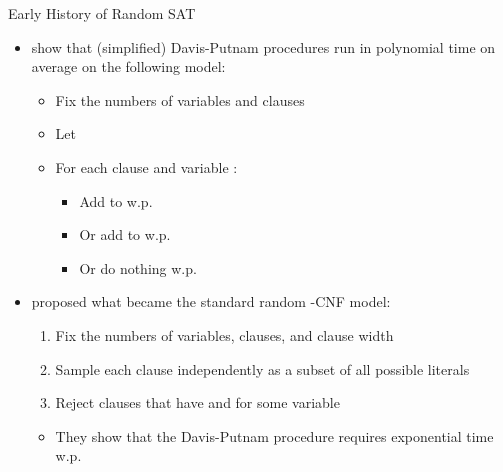 \documentclass{beamer}
\begin{document}
\begin{frame}{Early History of Random SAT}
  \begin{itemize}
    \item \textcolor{gray}{\textcite{DBLP:journals/ipl/GoldbergPB82}} show that
          (simplified) \alert{Davis-Putnam procedures} run in \alert{polynomial
          time} on average on the following model:
          \begin{itemize}
            \item Fix the numbers of \alert{variables} and \alert{clauses}
            \item Let 
            \item For each clause  and variable :
            \begin{itemize}
              \item \alert{Add}  to  w.p.\
              \item Or \alert{add}  to  w.p.\
              \item Or \alert{do nothing} w.p.\ \structure{$1 - 2p$}
            \end{itemize}
          \end{itemize}
          \pause
    \item \textcolor{gray}{\textcite{DBLP:journals/dam/FrancoP83}} proposed what
          became the \alert{standard} random -CNF model:
    \begin{enumerate}
      \item Fix the numbers of \alert{variables}, \alert{clauses}, and
            \alert{clause width}
      \item \alert{Sample each clause} independently as a subset of all possible
            literals
      \item \alert{Reject} clauses that have \structure{$x$} and
             for some variable 
    \end{enumerate}
    \begin{itemize}
      \item They show that the Davis-Putnam procedure \alert{requires
            exponential time} w.p.\ 
    \end{itemize}
  \end{itemize}
\end{frame}
\end{document}
